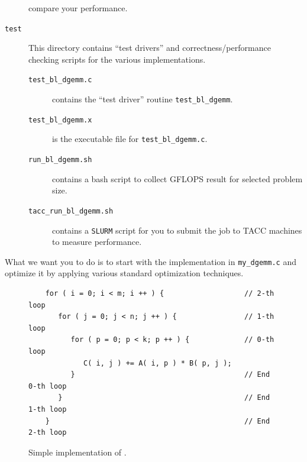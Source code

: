 \begin{description}
compare your performance.
\item[{\tt test}] This directory contains ``test drivers'' and correctness/performance checking scripts for the various implementations.
\begin{description}
\item[{\tt test\_bl\_dgemm.c}] contains the ``test driver'' routine {\tt test\_bl\_dgemm}. 
\item[{\tt test\_bl\_dgemm.x}] is the executable file for {\tt test\_bl\_dgemm.c}. 
\item[{\tt run\_bl\_dgemm.sh}] contains a bash script to collect GFLOPS result for selected problem size.
\item[{\tt tacc\_run\_bl\_dgemm.sh}] contains a {\tt SLURM} script for you to submit the job to TACC machines to measure performance.
\end{description}
\item[{\tt }]
\end{description}


What we want you to do is to start with the implementation in {\tt my\_dgemm.c} and optimize it by applying various standard optimization techniques.
\begin{figure}[tb!]
	\begin{center}
	\begin{minipage}{4.5in}
	\begin{verbatim}
	for ( i = 0; i < m; i ++ ) {                   // 2-th loop
	   for ( j = 0; j < n; j ++ ) {                // 1-th loop
	      for ( p = 0; p < k; p ++ ) {             // 0-th loop
             C( i, j ) += A( i, p ) * B( p, j );
	      }                                        // End 0-th loop
	   }                                           // End 1-th loop
	}                                              // End 2-th loop
	\end{verbatim}
	\end{minipage}
	\end{center}
	\caption{Simple implementation of \Gemm.}
	\label{fig:threeloops}
\end{figure}

